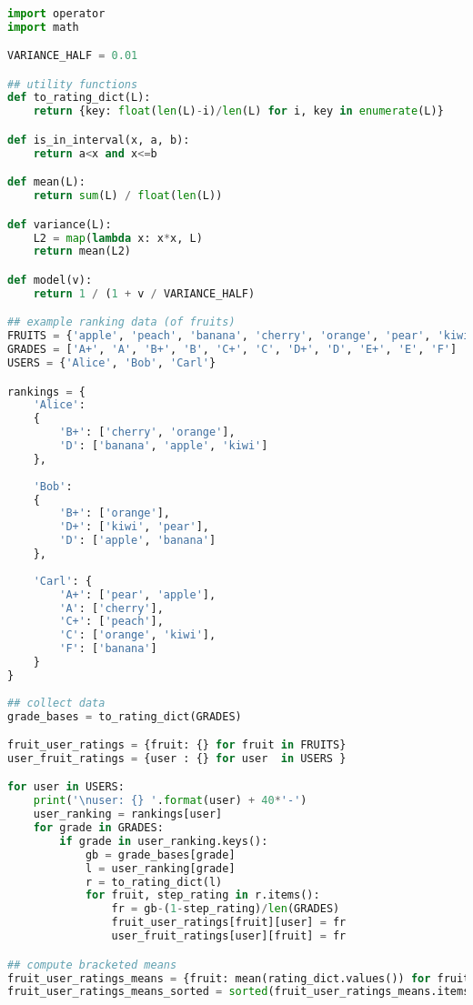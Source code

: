 \begin{lstlisting}[language=Python]

import operator
import math

VARIANCE_HALF = 0.01

## utility functions
def to_rating_dict(L): 
    return {key: float(len(L)-i)/len(L) for i, key in enumerate(L)}

def is_in_interval(x, a, b): 
    return a<x and x<=b

def mean(L): 
    return sum(L) / float(len(L))

def variance(L): 
    L2 = map(lambda x: x*x, L)
    return mean(L2)

def model(v): 
    return 1 / (1 + v / VARIANCE_HALF)

## example ranking data (of fruits)
FRUITS = {'apple', 'peach', 'banana', 'cherry', 'orange', 'pear', 'kiwi'}
GRADES = ['A+', 'A', 'B+', 'B', 'C+', 'C', 'D+', 'D', 'E+', 'E', 'F']
USERS = {'Alice', 'Bob', 'Carl'}

rankings = {
    'Alice': 
    {
        'B+': ['cherry', 'orange'], 
        'D': ['banana', 'apple', 'kiwi']
    },
    
    'Bob': 
    {
        'B+': ['orange'], 
        'D+': ['kiwi', 'pear'], 
        'D': ['apple', 'banana']
    },
    
    'Carl': {
        'A+': ['pear', 'apple'], 
        'A': ['cherry'], 
        'C+': ['peach'], 
        'C': ['orange', 'kiwi'], 
        'F': ['banana']
    }
}
    
## collect data
grade_bases = to_rating_dict(GRADES)

fruit_user_ratings = {fruit: {} for fruit in FRUITS}
user_fruit_ratings = {user : {} for user  in USERS }

for user in USERS:
    print('\nuser: {} '.format(user) + 40*'-')
    user_ranking = rankings[user]
    for grade in GRADES:
        if grade in user_ranking.keys():
            gb = grade_bases[grade]
            l = user_ranking[grade]
            r = to_rating_dict(l)
            for fruit, step_rating in r.items():
                fr = gb-(1-step_rating)/len(GRADES)
                fruit_user_ratings[fruit][user] = fr
                user_fruit_ratings[user][fruit] = fr

## compute bracketed means
fruit_user_ratings_means = {fruit: mean(rating_dict.values()) for fruit, rating_dict in fruit_user_ratings.items()}
fruit_user_ratings_means_sorted = sorted(fruit_user_ratings_means.items(), key=operator.itemgetter(1))


\end{lstlisting}
